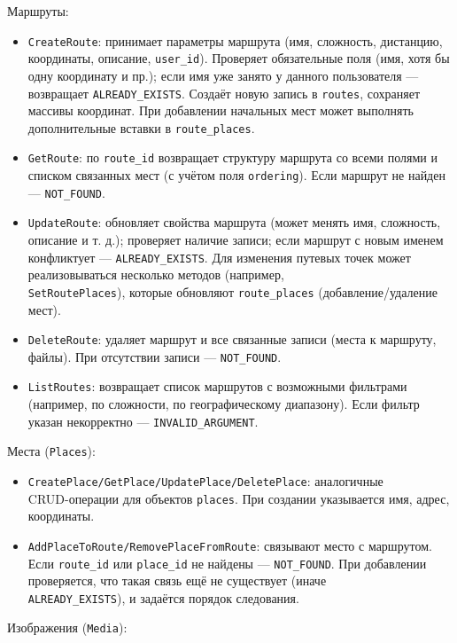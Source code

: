Маршруты:
\begin{itemize}
    \item \texttt{CreateRoute}: принимает параметры маршрута (имя, сложность, дистанцию, координаты, описание, \texttt{user\_id}). Проверяет обязательные поля (имя, хотя бы одну координату и пр.); если имя уже занято у данного пользователя — возвращает \texttt{ALREADY\_EXISTS}. Создаёт новую запись в \texttt{routes}, сохраняет массивы координат. При добавлении начальных мест может выполнять дополнительные вставки в \texttt{route\_places}.
    \item \texttt{GetRoute}: по \texttt{route\_id} возвращает структуру маршрута со всеми полями и списком связанных мест (с учётом поля \texttt{ordering}). Если маршрут не найден — \texttt{NOT\_FOUND}.
    \item \texttt{UpdateRoute}: обновляет свойства маршрута (может менять имя, сложность, описание и т. д.); проверяет наличие записи; если маршрут с новым именем конфликтует — \texttt{ALREADY\_EXISTS}. Для изменения путевых точек может реализовываться несколько методов (например, \\ \texttt{SetRoutePlaces}), которые обновляют \texttt{route\_places} (добавление/удаление мест).
    \item \texttt{DeleteRoute}: удаляет маршрут и все связанные записи (места к маршруту, файлы). При отсутствии записи — \texttt{NOT\_FOUND}.
    \item \texttt{ListRoutes}: возвращает список маршрутов с возможными фильтрами (например, по сложности, по географическому диапазону). Если фильтр указан некорректно — \texttt{INVALID\_ARGUMENT}.
\end{itemize}
\noindent Места (\texttt{Places}):
\begin{itemize}
    \item \texttt{CreatePlace/GetPlace/UpdatePlace/DeletePlace}: аналогичные \\ CRUD-операции для объектов \texttt{places}. При создании указывается имя, адрес, координаты.
    \item \texttt{AddPlaceToRoute/RemovePlaceFromRoute}: связывают место с маршрутом. Если \texttt{route\_id} или \texttt{place\_id} не найдены — \texttt{NOT\_FOUND}. При добавлении проверяется, что такая связь ещё не существует (иначе \\ \texttt{ALREADY\_EXISTS}), и задаётся порядок следования.
\end{itemize}
\noindent Изображения (\texttt{Media}):

